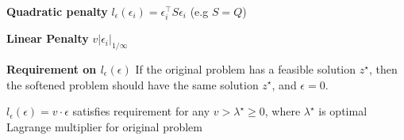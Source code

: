 \textbf{Quadratic penalty}
$l_\epsilon(\epsilon_i) =
	\epsilon_i^\top S \epsilon_i$ (e.g $S = Q$)

\textbf{Linear Penalty}
$v|\epsilon_i|_{1/\infty}$


\textbf{Requirement on $l_\epsilon(\epsilon)$}
If the original problem has a feasible solution $z^\star$,
then the softened problem should have the same solution $z^\star$,
and $\epsilon = 0$.

\begin{theorem}
	$l_\epsilon(\epsilon) = v \cdot \epsilon$ satisfies requirement for any $v > \lambda^\star \geq 0$,
	where $\lambda^\star$ is optimal Lagrange multiplier for original problem
\end{theorem}



